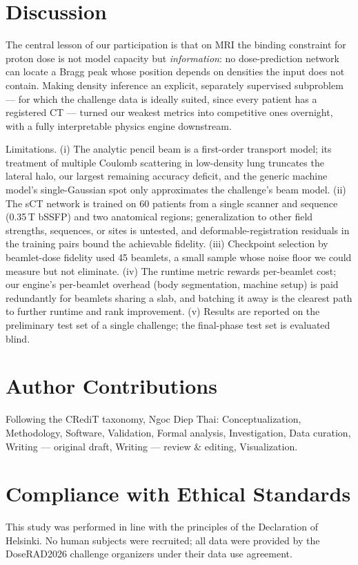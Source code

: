 \documentclass[runningheads]{llncs}
\begin{document}
\section{Discussion}
The central lesson of our participation is that on MRI the binding constraint for proton dose is not model capacity but \emph{information}: no dose-prediction network can locate a Bragg peak whose position depends on densities the input does not contain. Making density inference an explicit, separately supervised subproblem --- for which the challenge data is ideally suited, since every patient has a registered CT --- turned our weakest metrics into competitive ones overnight, with a fully interpretable physics engine downstream.

Limitations. (i) The analytic pencil beam is a first-order transport model; its treatment of multiple Coulomb scattering in low-density lung truncates the lateral halo, our largest remaining accuracy deficit, and the generic machine model's single-Gaussian spot only approximates the challenge's beam model. (ii) The sCT network is trained on 60 patients from a single scanner and sequence (0.35\,T bSSFP) and two anatomical regions; generalization to other field strengths, sequences, or sites is untested, and deformable-registration residuals in the training pairs bound the achievable fidelity. (iii) Checkpoint selection by beamlet-dose fidelity used 45 beamlets, a small sample whose noise floor we could measure but not eliminate. (iv) The runtime metric rewards per-beamlet cost; our engine's per-beamlet overhead (body segmentation, machine setup) is paid redundantly for beamlets sharing a slab, and batching it away is the clearest path to further runtime and rank improvement. (v) Results are reported on the preliminary test set of a single challenge; the final-phase test set is evaluated blind.

\section{Author Contributions}
Following the CRediT taxonomy, Ngoc Diep Thai: Conceptualization, Methodology, Software, Validation, Formal analysis, Investigation, Data curation, Writing --- original draft, Writing --- review \& editing, Visualization.

\section{Compliance with Ethical Standards}
This study was performed in line with the principles of the Declaration of Helsinki. No human subjects were recruited; all data were provided by the DoseRAD2026 challenge organizers under their data use agreement.
\end{document}
